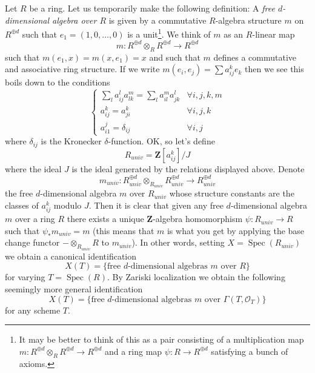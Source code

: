 \documentclass{stacks-project}
\theoremstyle{plain}
\theoremstyle{definition}
\theoremstyle{remark}
\numberwithin{equation}{subsection}
\def\Spec{\mathop{\mathrm{Spec}}}
\begin{document}
\medskip\noindent
Let $R$ be a ring. Let us temporarily make the following definition:
A {\it free $d$-dimensional algebra over $R$}
is given by a commutative $R$-algebra structure $m$ on $R^{\oplus d}$
such that $e_1 = (1, 0, \ldots, 0)$ is a unit\footnote{It may be better
to think of this as a pair consisting of a multiplication map
$m : R^{\oplus d} \otimes_R R^{\oplus d} \to R^{\oplus d}$ and
a ring map $\psi : R \to R^{\oplus d}$ satisfying a bunch of axioms.}.
We think of $m$ as an $R$-linear map
$$
m : R^{\oplus d} \otimes_R R^{\oplus d} \longrightarrow R^{\oplus d}
$$
such that $m(e_1, x) = m(x, e_1) = x$ and such that $m$ defines a
commutative and associative ring structure. If we write
$m(e_i, e_j) = \sum a_{ij}^ke_k$ then we see this boils down
to the conditions
$$
\left\{
\begin{matrix}
\sum_l a_{ij}^la_{lk}^m = \sum_l a_{il}^ma_{jk}^l & \forall i, j, k, m \\
a_{ij}^k = a_{ji}^k & \forall i, j, k \\
a_{i1}^j = \delta_{ij} & \forall i, j
\end{matrix}
\right.
$$
where $\delta_{ij}$ is the Kronecker $\delta$-function. OK, so let's define
$$
R_{univ} = \mathbf{Z}[a_{ij}^k]/J
$$
where the ideal $J$ is the ideal generated by the relations displayed above.
Denote
$$
m_{univ} :
R_{univ}^{\oplus d} \otimes_{R_{univ}} R_{univ}^{\oplus d}
\longrightarrow
R_{univ}^{\oplus d}
$$
the free $d$-dimensional algebra $m$ over $R_{univ}$ whose structure
constants are the classes of $a_{ij}^k$ modulo $J$.
Then it is clear that given any free $d$-dimensional algebra $m$ over a ring
$R$ there exists a unique $\mathbf{Z}$-algebra homomorphism
$\psi : R_{univ} \to R$ such that $\psi_*m_{univ} = m$ (this means that
$m$ is what you get by applying the base change functor
$- \otimes_{R_{univ}} R$ to $m_{univ}$). In other words, setting
$X = \Spec(R_{univ})$ we obtain a canonical identification
$$
X(T) = \{\text{free }d\text{-dimensional algebras }m\text{ over }R\}
$$
for varying $T = \Spec(R)$. By Zariski localization we obtain
the following seemingly more general identification
\begin{equation}
\label{equation-objects}
X(T) = \{\text{free }d\text{-dimensional algebras }
m\text{ over }\Gamma(T, \mathcal{O}_T)\}
\end{equation}
for any scheme $T$.
\end{document}
